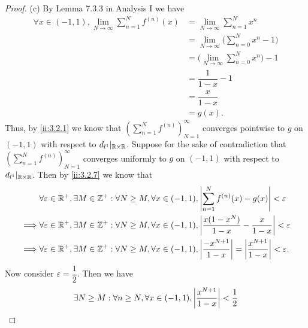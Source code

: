 \begin{proof}{(c)}
  By Lemma 7.3.3 in Analysis I we have
  \begin{align*}
    \forall x \in (-1, 1), \lim_{N \to \infty} \sum_{n = 1}^N f^{(n)}(x) & = \lim_{N \to \infty} \sum_{n = 1}^N x^n                 \\
                                                                         & = \lim_{N \to \infty} \bigg(\sum_{n = 0}^N x^n - 1\bigg) \\
                                                                         & = \bigg(\lim_{N \to \infty} \sum_{n = 0}^N x^n\bigg) - 1 \\
                                                                         & = \dfrac{1}{1 - x} - 1                                   \\
                                                                         & = \dfrac{x}{1 - x}                                       \\
                                                                         & = g(x).
  \end{align*}
  Thus, by \cref{ii:3.2.1} we know that \((\sum_{n = 1}^N f^{(n)})_{N = 1}^\infty\) converges pointwise to \(g\) on \((-1, 1)\) with respect to \(d_{l^1}|_{\mathbb{R} \times \mathbb{R}}\).
  Suppose for the sake of contradiction that \((\sum_{n = 1}^N f^{(n)})_{N = 1}^\infty\) converges uniformly to \(g\) on \((-1, 1)\) with respect to \(d_{l^1}|_{\mathbb{R} \times \mathbb{R}}\).
  Then by \cref{ii:3.2.7} we know that
  \begin{align*}
             & \forall \varepsilon \in \mathbb{R}^+, \exists M \in \mathbb{Z}^+ : \forall N \geq M, \forall x \in (-1, 1), \left\lvert\sum_{n = 1}^N f^{(n)}(x) - g(x)\right\rvert < \varepsilon                            \\
    \implies & \forall \varepsilon \in \mathbb{R}^+, \exists M \in \mathbb{Z}^+ : \forall N \geq M, \forall x \in (-1, 1), \left\lvert\dfrac{x(1 - x^N)}{1 - x} - \dfrac{x}{1 - x}\right\rvert < \varepsilon                \\
    \implies & \forall \varepsilon \in \mathbb{R}^+, \exists M \in \mathbb{Z}^+ : \forall N \geq M, \forall x \in (-1, 1), \left\lvert\dfrac{-x^{N + 1}}{1 - x}\right\rvert = \left\lvert\dfrac{x^{N + 1}}{1 - x}\right\rvert < \varepsilon.
  \end{align*}
  Now consider \(\varepsilon = \dfrac{1}{2}\).
  Then we have
  \begin{align*}
             & \exists N \geq M : \forall n \geq N, \forall x \in (-1, 1), \abs{\dfrac{x^{N + 1}}{1 - x}} < \dfrac{1}{2}                                                               \\

\end{align*}
\end{proof}
